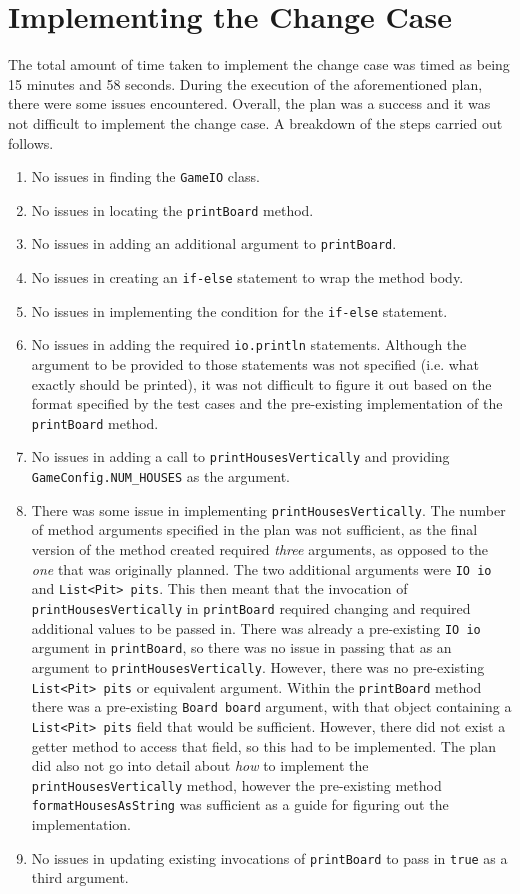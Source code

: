 \documentclass[10pt, a4paper, conference]{IEEEtran}
\begin{document}
\section{Implementing the Change Case}
The total amount of time taken to implement the change case was timed as being 
15 minutes and 58 seconds. During the execution of the aforementioned plan, there were some
issues encountered. Overall, the plan was a success and it was not difficult to
implement the change case. A breakdown of the steps carried out follows. 
\begin{enumerate}
  \item No issues in finding the \texttt{GameIO} class.
  \item No issues in locating the \texttt{printBoard} method.
  \item No issues in adding an additional argument to \texttt{printBoard}.
  \item No issues in creating an \texttt{if-else} statement to wrap the method
    body.
  \item No issues in implementing the condition for the \texttt{if-else}
    statement.
  \item No issues in adding the required \texttt{io.println} statements.
    Although the argument to be provided to those statements was not specified
    (i.e. what exactly should be printed), it was not difficult to figure it
    out based on the format specified by the test cases and the pre-existing
    implementation of the \texttt{printBoard} method. 
  \item No issues in adding a call to \texttt{printHousesVertically} and
    providing \texttt{GameConfig.NUM\_HOUSES} as the argument.
  \item There was some issue in implementing \texttt{printHousesVertically}.
    The number of method arguments specified in the plan was not sufficient, as
    the final version of the method created required \textit{three} arguments, as opposed to
    the \textit{one} that was originally planned. The two additional arguments
    were \texttt{IO io} and \texttt{List<Pit> pits}. This then meant that the
    invocation of \texttt{printHousesVertically} in \texttt{printBoard}
    required changing and required additional values to be passed in. There was
    already a pre-existing \texttt{IO io} argument in \texttt{printBoard}, so there was no
    issue in passing that as an argument to \texttt{printHousesVertically}.
    However, there was no pre-existing \texttt{List<Pit> pits} or equivalent
    argument. Within the \texttt{printBoard} method there was a pre-existing
    \texttt{Board board} argument, with that object containing
    a \texttt{List<Pit> pits} field that would be sufficient. However, there did not
    exist a getter method to access that field, so this had to be
    implemented. The plan did also not go into detail about \textit{how} to
    implement the \texttt{printHousesVertically} method, however the
    pre-existing method \texttt{formatHousesAsString} was sufficient as a guide for
    figuring out the implementation.
  \item No issues in updating existing invocations of 
    \texttt{printBoard} to pass in \texttt{true} as a third argument.
\end{enumerate}
\end{document}
